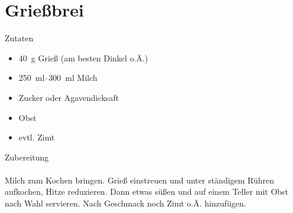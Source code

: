 \section*{Grießbrei}
\ihead{}\ohead{}
\cfoot{}
{\Large Zutaten}
\begin{multicols}{2}
\begin{itemize}
    \item \SI{40}{g} Grieß (am besten Dinkel o.Ä.)
    \item \SIrange{250}{300}{ml} Milch
    \item Zucker oder Agavendicksaft
    \item Obst
    \item evtl. Zimt
\end{itemize}
\columnbreak
\end{multicols}
\noindent
{\Large Zubereitung}\\
\\
Milch zum Kochen bringen.
Grieß einstreuen und unter ständigem Rühren aufkochen, Hitze reduzieren.
Dann etwas süßen und auf einem Teller mit Obst nach Wahl servieren.
Nach Geschmack noch Zimt o.Ä. hinzufügen.